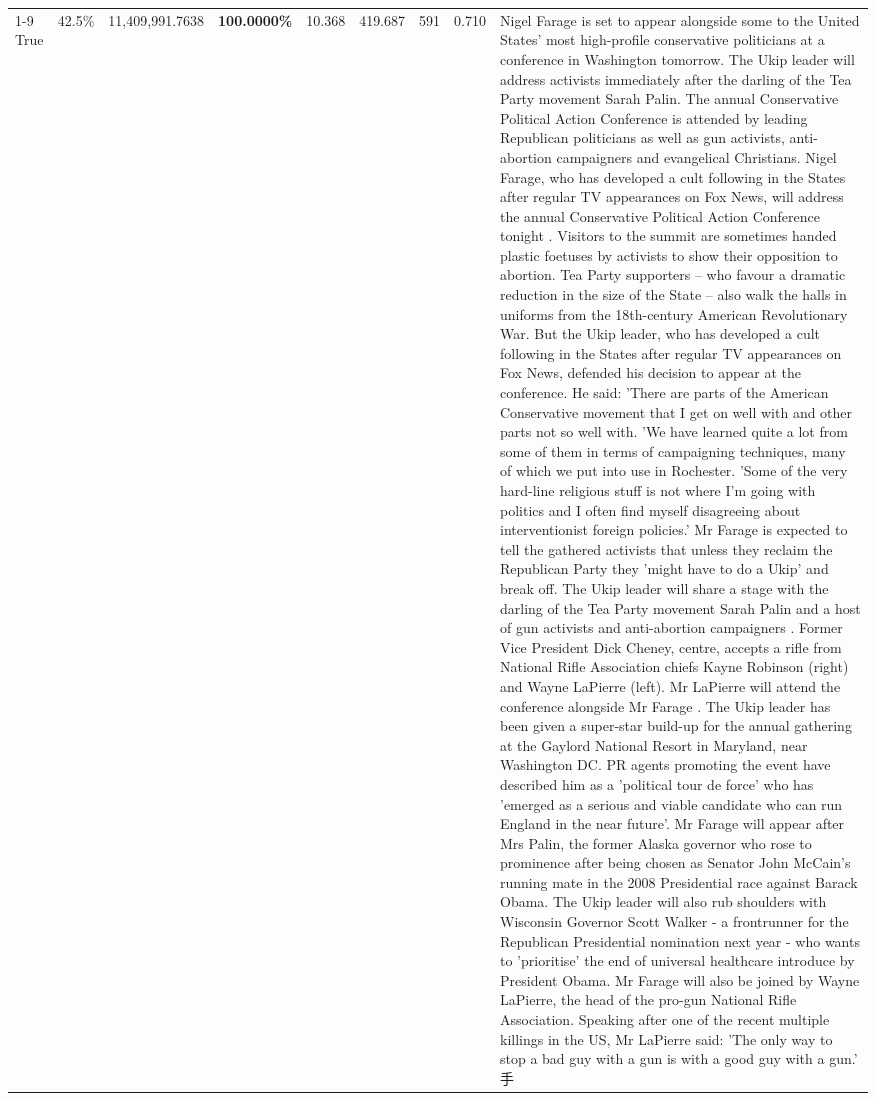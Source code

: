 \begin{table}[H]
\begin{tabular}{lllrlllll}
\cline{1-9}
True & 42.5\% & 11,409,991.7638 & \bfseries \color{red} 100.0000\% & 10.368 & 419.687 & 591 & 0.710 & Nigel Farage is set to appear alongside some to the United States' most high-profile conservative politicians at a conference in Washington tomorrow. The Ukip leader will address activists immediately after the darling of the Tea Party movement Sarah Palin. The annual Conservative Political Action Conference is attended by leading Republican politicians as well as gun activists, anti-abortion campaigners and evangelical Christians. Nigel Farage, who has developed a cult following in the States after regular TV appearances on Fox News, will address the annual Conservative Political Action Conference tonight . Visitors to the summit are sometimes handed plastic foetuses by activists to show their opposition to abortion. Tea Party supporters – who favour a dramatic reduction in the size of the State – also walk the halls in uniforms from the 18th-century American Revolutionary War. But the Ukip leader, who has developed a cult following in the States after regular TV appearances on Fox News, defended his decision to appear at the conference. He said: 'There are parts of the American Conservative movement that I get on well with and other parts not so well with. 'We have learned quite a lot from some of them in terms of campaigning techniques, many of which we put into use in Rochester. 'Some of the very hard-line religious stuff is not where I'm going with politics and I often find myself disagreeing about interventionist foreign policies.' Mr Farage is expected to tell the gathered activists that unless they reclaim the Republican Party they 'might have to do a Ukip' and break off. The Ukip leader will share a stage with the darling of the Tea Party movement Sarah Palin and a host of gun activists and anti-abortion campaigners . Former Vice President Dick Cheney, centre, accepts a rifle from National Rifle Association chiefs Kayne Robinson (right) and Wayne LaPierre (left). Mr LaPierre will attend the conference alongside Mr Farage . The Ukip leader has been given a super-star build-up for the annual gathering at the Gaylord National Resort in Maryland, near Washington DC. PR agents promoting the event have described him as a 'political tour de force' who has 'emerged as a serious and viable candidate who can run England in the near future'. Mr Farage will appear after Mrs Palin, the former Alaska governor who rose to prominence after being chosen as Senator John McCain's running mate in the 2008 Presidential race against Barack Obama. The Ukip leader will also rub shoulders with Wisconsin Governor Scott Walker - a frontrunner for the Republican Presidential nomination next year - who wants to 'prioritise' the end of universal healthcare introduce by President Obama. Mr Farage will also be joined by Wayne LaPierre, the head of the pro-gun National Rifle Association. Speaking after one of the recent multiple killings in the US, Mr LaPierre said: 'The only way to stop a bad guy with a gun is with a good guy with a gun.' 手 \\

\end{tabular}
\end{table}
